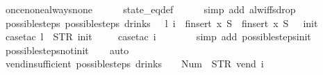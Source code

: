 \begin{isabellebody}
\ once{\isacharunderscore}none{\isacharunderscore}always{\isacharunderscore}none\isanewline
\ \ \ \ \isamarkupfalse%
\ state_eq{\isacharunderscore}def\isanewline
\ \ \ \ \isamarkupfalse%
\ {\isacharparenleft}simp\ add{\isacharcolon}\ alw{\isacharunderscore}iff{\isacharunderscore}sdrop{\isacharparenright}\isanewline
{}\isamarkupfalse%
%
\endisatagproof
{\isafoldproof}%
%
\isadelimproof
\isanewline
%
\endisadelimproof
\isanewline
{}\isamarkupfalse%
\ possible{\isacharunderscore}steps{\isacharunderscore}{}{\isacharcolon}\ {\isachardoublequoteopen}possible{\isacharunderscore}steps\ drinks\ {}\ {\isacharless}{\isachargreater}\ l\ i\ {\isacharequal}\ finsert\ x\ S{\isacharprime}\ {\isasymLongrightarrow}\ finsert\ x\ S{\isacharprime}\ {\isacharequal}\ {\isacharbraceleft}{\isacharbar}{\isacharparenleft}{}{\isacharcomma}\ init{\isacharparenright}{\isacharbar}{\isacharbraceright}{\isachardoublequoteclose}\isanewline
%
\isadelimproof
\ \ %
\endisadelimproof
%
\isatagproof
{}\isamarkupfalse%
\ {\isacharparenleft}case{\isacharunderscore}tac\ {\isachardoublequoteopen}l\ {\isacharequal}\ STR\ {\isacharprime}{\isacharprime}init{\isacharprime}{\isacharprime}{\isachardoublequoteclose}{\isacharparenright}\isanewline
\ \ \ \isamarkupfalse%
\ {\isacharparenleft}case{\isacharunderscore}tac\ {\isachardoublequoteopen}i\ {\isacharequal}\ {\isacharbrackleft}{\isacharbrackright}{\isachardoublequoteclose}{\isacharparenright}\isanewline
\ \ \ \ \isamarkupfalse%
\ {\isacharparenleft}simp\ add{\isacharcolon}\ possible{\isacharunderscore}steps{\isacharunderscore}init{\isacharparenright}\isanewline
\ \ \isamarkupfalse%
\ possible{\isacharunderscore}steps{\isacharunderscore}not{\isacharunderscore}init\isanewline
\ \ \isamarkupfalse%
\ auto%
\endisatagproof
{\isafoldproof}%
%
\isadelimproof
\isanewline
%
\endisadelimproof
\isanewline
{}\isamarkupfalse%
\ vend{\isacharunderscore}insufficient{\isacharcolon}\ {\isachardoublequoteopen}possible{\isacharunderscore}steps\ drinks\ {}\ {\isacharparenleft}{\isacharless}{\isachargreater}{\isacharparenleft}{}\ {\isacharcolon}{\isacharequal}\ Num\ {}{\isacharparenright}{\isacharparenright}\ STR\ {\isacharprime}{\isacharprime}vend{\isacharprime}{\isacharprime}\ i\ {\isacharequal}\ {\isacharbraceleft}{\isacharbar}{\isacharbar}{\isacharbraceright}{\isachardoublequoteclose}\isanewline
%
\isadelimproof
\ \ %
\endisadelimproof

\end{isabellebody}
